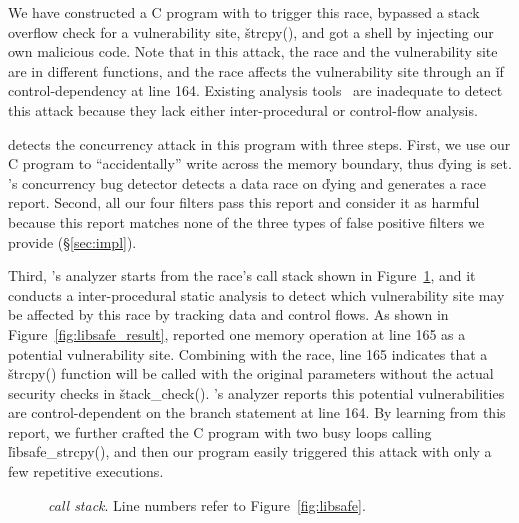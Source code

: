 We have constructed a C program with \libsafe to trigger this race, bypassed a 
stack overflow check for a vulnerability site, \v{strcpy()}, and got a shell by 
injecting our own malicious code. Note that in this attack, the race and the 
vulnerability site are in different functions, and the race affects the 
vulnerability site through an \v{if} control-dependency at line 164. Existing 
analysis tools~\cite{conseq:asplos11,yamaguchi:sp14,livshits05finding} are 
inadequate to detect this attack because they lack either inter-procedural or 
control-flow analysis.

\xxx detects the concurrency attack in this program with three steps. First, we 
use our C program to ``accidentally'' write across the memory boundary, thus 
\v{dying} is set. \xxx's concurrency bug detector \tsan detects a data race on 
\v{dying} and generates a race report. Second, all our four filters pass this 
report and consider it as harmful because this report matches none of the three 
types of false positive filters we provide (\S\ref{sec:impl}).

Third, \xxx's analyzer starts from the race's call stack shown in 
Figure~\ref{fig:call_stack}, and it conducts a inter-procedural static analysis 
to detect which vulnerability site may be affected by this race by tracking 
data and control flows. As shown in Figure~\ref{fig:libsafe_result}, \xxx 
reported one memory operation at line 165 as a potential vulnerability site. 
Combining with the race, line 165 indicates that a \v{strcpy()} function will be 
called with the original parameters without the actual security checks in 
\v{stack\_check()}. \xxx's analyzer reports this potential vulnerabilities are 
control-dependent on the branch statement at line 164. By learning from this 
report, we further crafted the C program with two busy loops calling 
\v{libsafe\_strcpy()}, and then our program easily triggered this attack with 
only a few repetitive executions. 

\begin{figure}
  \centering
  \mbox{}
  \vspace{-.1in}
  \caption{{\em \libsafe call stack}. \rm {Line numbers refer to 
Figure~\ref{fig:libsafe}.}
  }
  \label{fig:call_stack}
\end{figure}


